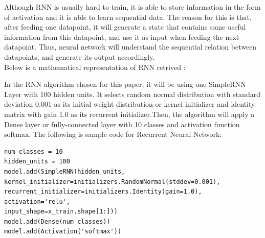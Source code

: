 \documentclass[letterpaper]{article} %
\begin{document}
Although RNN is usually hard to train, it is able to store information in the form of activation and it is able to learn sequential data. The reason for this is that, after feeding one datapoint, it will generate a state that contains some useful information from this datapoint, and use it as input when feeding the next datapoint. Thus, neural network will understand the sequential relation between datapoints, and generate its output accordingly. \\ 
Below is a mathematical representation of RNN retrived :
\begingroup
{} 
\endgroup
\medskip
In the RNN algorithm chosen for this paper, it will be using one SimpleRNN Layer with 100 hidden units. It selects random normal distribution with standard deviation 0.001 as its initial weight distribution or kernel initializer and identity matrix with gain 1.0 as its recurrent initializer.Then, the algorithm will apply a Dense layer or fully-connected layer with 10 classes and activation function softmax. The following is sample code for Recurrent Neural Network:

\begin{lstlisting}[columns=fullflexible, keepspaces=true, stepnumber=1]
num_classes = 10
hidden_units = 100
model.add(SimpleRNN(hidden_units,
kernel_initializer=initializers.RandomNormal(stddev=0.001),
recurrent_initializer=initializers.Identity(gain=1.0),
activation='relu',
input_shape=x_train.shape[1:]))
model.add(Dense(num_classes))
model.add(Activation('softmax'))
\end{lstlisting}
\end{document}
